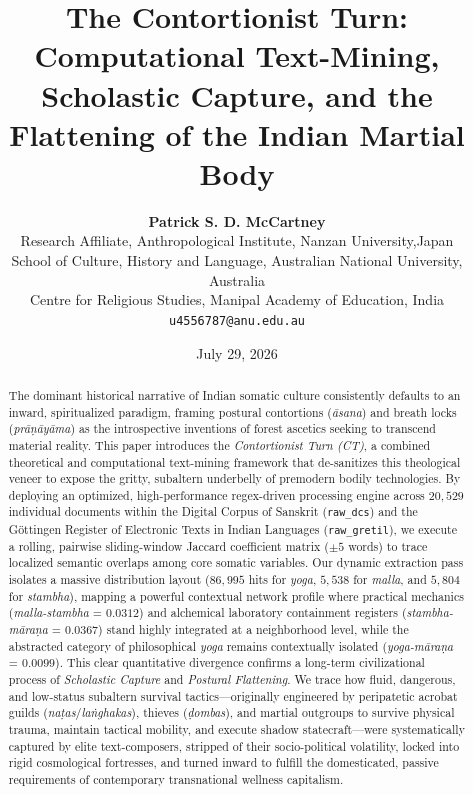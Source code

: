 \documentclass[11pt,twoside,letterpaper]{article}
\title{\textbf{The Contortionist Turn:\\Computational Text-Mining, Scholastic Capture, and the Flattening of the Indian Martial Body}}
\author{
    \textbf{Patrick S. D. McCartney}\\
    \small Research Affiliate, Anthropological Institute, Nanzan University,Japan \\
    \small School of Culture, History and Language, Australian National University, Australia \\
    \small Centre for Religious Studies, Manipal Academy of Education, India\\
    \small \texttt{u4556787@anu.edu.au}
}
\date{July 29, 2026}
\begin{document}
\maketitle

\begin{abstract}
The dominant historical narrative of Indian somatic culture consistently defaults to an inward, spiritualized paradigm, framing postural contortions (\textit{āsana}) and breath locks (\textit{prāṇāyāma}) as the introspective inventions of forest ascetics seeking to transcend material reality. This paper introduces the \textit{Contortionist Turn (CT)}, a combined theoretical and computational text-mining framework that de-sanitizes this theological veneer to expose the gritty, subaltern underbelly of premodern bodily technologies. By deploying an optimized, high-performance regex-driven processing engine across $20,529$ individual documents within the Digital Corpus of Sanskrit (\texttt{raw\_dcs}) and the Göttingen Register of Electronic Texts in Indian Languages (\texttt{raw\_gretil}), we execute a rolling, pairwise sliding-window Jaccard coefficient matrix ($\pm 5$ words) to trace localized semantic overlaps among core somatic variables. Our dynamic extraction pass isolates a massive distribution layout ($86,995$ hits for \textit{yoga}, $5,538$ for \textit{malla}, and $5,804$ for \textit{stambha}), mapping a powerful contextual network profile where practical mechanics (\textit{malla-stambha} = $0.0312$) and alchemical laboratory containment registers (\textit{stambha-māraṇa} = $0.0367$) stand highly integrated at a neighborhood level, while the abstracted category of philosophical \textit{yoga} remains contextually isolated (\textit{yoga-māraṇa} = $0.0099$). This clear quantitative divergence confirms a long-term civilizational process of \textit{Scholastic Capture} and \textit{Postural Flattening}. We trace how fluid, dangerous, and low-status subaltern survival tactics—originally engineered by peripatetic acrobat guilds (\textit{naṭas}/\textit{laṅghakas}), thieves (\textit{ḍombas}), and martial outgroups to survive physical trauma, maintain tactical mobility, and execute shadow statecraft—were systematically captured by elite text-composers, stripped of their socio-political volatility, locked into rigid cosmological fortresses, and turned inward to fulfill the domesticated, passive requirements of contemporary transnational wellness capitalism.
\end{abstract}
\end{document}
